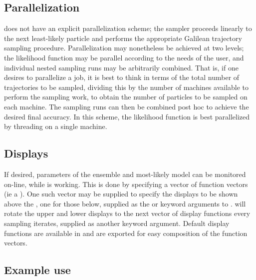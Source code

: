 \subsection{Parallelization}
 does not have an explicit parallelization scheme; the sampler proceeds linearly to the next least-likely particle and performs the appropriate Galilean trajectory sampling procedure. Parallelization may nonetheless be achieved at two levels; the likelihood function may be parallel according to the needs of the user, and individual nested sampling runs may be arbitrarily combined. That is, if one desires to parallelize a  job, it is best to think in terms of the total number of trajectories to be sampled, dividing this by the number of machines available to perform the sampling work, to obtain the number of particles to be sampled on each machine. The sampling runs can then be combined post hoc to achieve the desired final accuracy. In this scheme, the likelihood function is best parallelized by threading on a single machine.

\subsection{Displays}
If desired, parameters of the ensemble and most-likely model can be monitored on-line, while  is working. This is done by specifying a vector of function vectors (ie a ). One such vector may be supplied to specify the displays to be shown above the , one for those below, supplied as the  or  keyword arguments to .  will rotate the upper and lower displays to the next vector of display functions every  sampling iterates, supplied as another  keyword argument. Default display functions are available in  and are exported for easy composition of the function vectors.

\subsection{Example use}